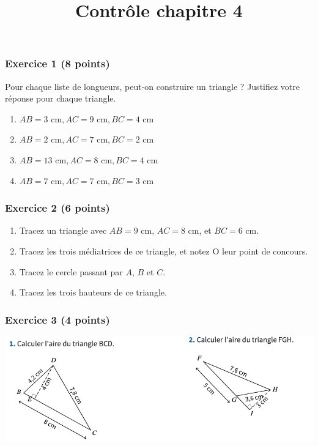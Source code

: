 \documentclass[14pt]{extreport}
\title{Contrôle chapitre 4}
\date{}
\theoremstyle{plain}
\begin{document}
\subsubsection*{Exercice 1 (8 points)}

Pour chaque liste de longueurs, peut-on construire un triangle ? Justifiez votre réponse pour chaque triangle. \begin{enumerate}
\item $AB = 3\text{ cm}, AC=9\text{ cm},BC = 4\text{ cm}$
\item $AB = 2\text{ cm}, AC=7\text{ cm},BC = 2\text{ cm}$
\item $AB = 13\text{ cm}, AC=8\text{ cm},BC = 4\text{ cm}$
\item $AB = 7\text{ cm}, AC=7\text{ cm},BC = 3\text{ cm}$
\end{enumerate}
\subsubsection*{Exercice 2 (6 points)}
 \begin{enumerate}
 \item Tracez un triangle avec $AB = 9$ cm, $AC = 8$ cm, et $BC = 6$ cm. 
 \item Tracez les trois médiatrices de ce triangle, et notez O leur point de concours. 
 \item Tracez le cercle passant par $A$, $B$ et $C$. 
 \item Tracez les trois hauteurs de ce triangle. 
 \end{enumerate}

\subsubsection*{Exercice 3 (4 points)}

\includegraphics[scale=.45]{Exo3}
\end{document}
